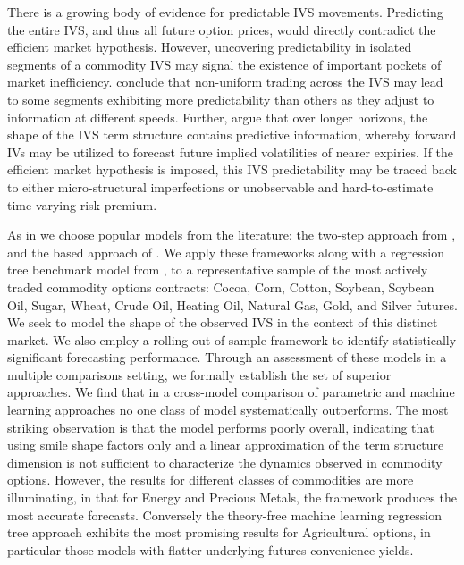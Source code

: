 \documentclass[12pt,a4paper]{article}
\begin{document}
There is a growing body of evidence for predictable IVS movements. Predicting the entire IVS, and thus all future option prices, would directly contradict the efficient market hypothesis. However, uncovering predictability in isolated segments of a commodity IVS may signal the existence of important pockets of market inefficiency. \cite{Chalamandaris2014} conclude that non-uniform trading across the IVS may lead to some segments exhibiting more predictability than others as they adjust to information at different speeds. Further, \cite{chalamandaris2011important} argue that over longer horizons, the shape of the IVS term structure contains predictive information, whereby forward IVs may be utilized to forecast future implied volatilities of nearer expiries. If the efficient market hypothesis is imposed, this IVS predictability may be traced back to either micro-structural imperfections or unobservable and hard-to-estimate time-varying risk premium.

As in \cite{Chalamandaris2014} we choose popular models from the literature: the two-step approach from \cite{goncalves2006predictable}, and the \cite{diebold2006forecasting} based approach of \cite{chalamandaris2011important}. We apply these frameworks along with a regression tree benchmark model from \cite{AC10}, to a representative sample of the most actively traded commodity options contracts: Cocoa, Corn, Cotton, Soybean, Soybean Oil, Sugar, Wheat, Crude Oil, Heating Oil, Natural Gas, Gold, and Silver futures. We seek to model the shape of the observed IVS in the context of this distinct market. We also employ a rolling out-of-sample framework to identify statistically significant forecasting performance. Through an assessment of these models in a multiple comparisons setting, we formally establish the set of superior approaches. We find that in a cross-model comparison of parametric and machine learning approaches no one class of model systematically outperforms. The most striking observation is that the \cite{goncalves2006predictable} model performs poorly overall, indicating that using smile shape factors only and a linear approximation of the term structure dimension is not sufficient to characterize the dynamics observed in commodity options. However, the results for different classes of commodities are more illuminating, in that for Energy and Precious Metals, the \cite{chalamandaris2011important} framework produces the most accurate forecasts. Conversely the theory-free machine learning regression tree approach exhibits the most promising results for Agricultural options, in particular those models with flatter underlying futures convenience yields.
\end{document}
